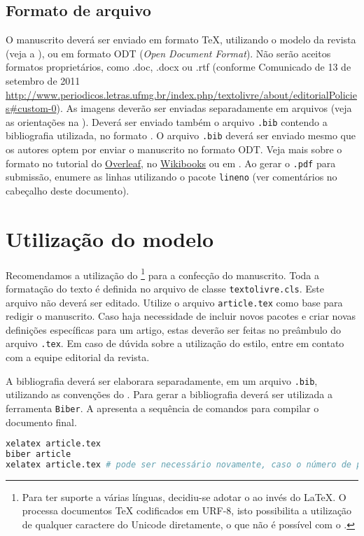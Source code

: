 \documentclass[portuguese]{textolivre}
\begin{document}
\subsection{Formato de arquivo}\label{sec-formato}
O manuscrito deverá ser enviado em formato \TeX{}, utilizando o modelo da revista (veja a ),
ou em formato ODT (\emph{Open Document Format}). Não serão aceitos formatos proprietários, como .doc, .docx ou .rtf
(conforme Comunicado de 13 de setembro de 2011 \url{http://www.periodicos.letras.ufmg.br/index.php/textolivre/about/editorialPolicies#custom-0}).
As imagens deverão ser enviadas separadamente em arquivos (veja as orientações na ).
Deverá ser enviado também o arquivo \texttt{.bib} contendo a bibliografia utilizada, no formato .
O arquivo \texttt{.bib} deverá ser enviado mesmo que os autores optem por enviar o manuscrito no formato ODT.
Veja mais sobre o formato  no tutorial do \href{https://www.overleaf.com/learn/latex/Bibliography_management_in_LaTeX#The_bibliography_file}{Overleaf},
no \href{https://en.wikibooks.org/wiki/LaTeX/Bibliography_Management}{Wikibooks} ou em \textcite{araujo2020}.
Ao gerar o \texttt{.pdf} para submissão, enumere as linhas utilizando o pacote \texttt{lineno} (ver comentários
no cabeçalho deste documento). 


\section{Utilização do modelo}\label{sec-modelo}
Recomendamos a utilização do \footnote{
Para ter suporte a várias línguas, decidiu-se adotar o  ao invés do \LaTeX{}.
O  processa documentos \TeX{} codificados em URF-8, isto possibilita
a utilização de qualquer caractere do Unicode diretamente, o que não é possível com o .
} para a confecção do manuscrito.
Toda a formatação do texto é definida no arquivo de classe \texttt{textolivre.cls}.
Este arquivo não deverá ser editado.
Utilize o arquivo \texttt{article.tex} como base para redigir o manuscrito.
Caso haja necessidade de incluir novos pacotes e criar novas definições específicas para um artigo,
estas deverão ser feitas no preâmbulo do arquivo \texttt{.tex}.
Em caso de dúvida sobre a utilização do estilo, entre em contato com a equipe editorial da revista.

A bibliografia deverá ser elaborara separadamente, em um arquivo \texttt{.bib}, utilizando as
convenções do . Para gerar a bibliografia deverá ser utilizada a ferramenta \texttt{Biber}.
A  apresenta a sequência de comandos para compilar o documento final.
\begin{lstlisting}[language=bash, label=lst-compiledocument, caption={Sequência para gerar o documento final.}]
xelatex article.tex
biber article
xelatex article.tex # pode ser necessário novamente, caso o número de páginas altere após inserir a bibliografia
\end{lstlisting} %
\end{document}
